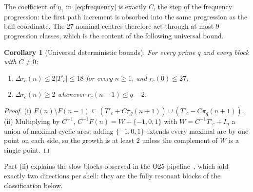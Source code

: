 \documentclass[11pt,a4paper]{article}
\theoremstyle{plain}
\newtheorem{corollary}{Corollary}
\theoremstyle{definition}
\newcommand{\Tp}{T'_c}
\begin{document}
    The coefficient of $\eta_1$ in~\eqref{eq:frequency} is exactly $C$, the step of the frequency
    progression: the first path increment is absorbed into the same progression as the ball
    coordinate.
    The $27$ nominal centres therefore act through at most $9$ progression classes, which is the
    content of the following universal bound.

    \begin{corollary}[Universal deterministic bounds]
      \label{cor:bounds}
      For every prime $q$ and every block with $C \ne 0$:
      \begin{enumerate}[nosep]
        \item $\Delta r_c(n) \le 2\lvert\Tp\rvert \le 18$ for every $n \ge 1$, and
          $r_c(0) \le 27$;
        \item $\Delta r_c(n) \ge 2$ whenever $r_c(n-1) \le q-2$.
      \end{enumerate}
    \end{corollary}

    \begin{proof}
      (i) $F(n)\setminus F(n-1) \subseteq (\Tp + C\pi_q(n+1)) \cup (\Tp - C\pi_q(n+1))$.
      (ii) Multiplying by $C^{-1}$, $C^{-1}F(n) = W + \{-1,0,1\}$ with $W = C^{-1}\Tp + I_n$ a
      union of maximal cyclic arcs; adding $\{-1,0,1\}$ extends every maximal arc by one point on
      each side, so the growth is at least $2$ unless the complement of $W$ is a single point.
    \end{proof}

    Part (ii) explains the slow blocks observed in the O25 pipeline~\cite{Beau2026a29}, which add
    exactly two directions per shell: they are the fully resonant blocks of the classification
    below.
\end{document}
